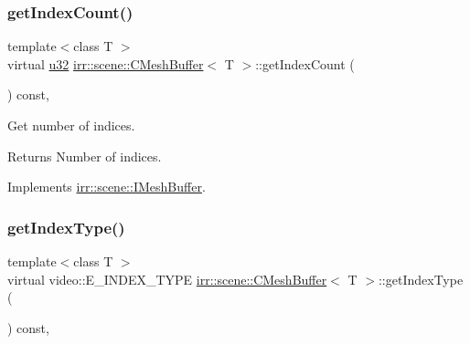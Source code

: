\subsubsection{\texorpdfstring{get\+Index\+Count()}{getIndexCount()}\hspace{0.1cm}{\footnotesize\ttfamily [2/2]}}
{\footnotesize\ttfamily template$<$class T $>$ \\
virtual \hyperlink{namespaceirr_a0416a53257075833e7002efd0a18e804}{u32} \hyperlink{classirr_1_1scene_1_1CMeshBuffer}{irr\+::scene\+::\+C\+Mesh\+Buffer}$<$ T $>$\+::get\+Index\+Count (\begin{DoxyParamCaption}{ }\end{DoxyParamCaption}) const\hspace{0.3cm}{\ttfamily [inline]}, {\ttfamily [virtual]}}



Get number of indices. 

\begin{DoxyReturn}{Returns}
Number of indices. 
\end{DoxyReturn}


Implements \hyperlink{classirr_1_1scene_1_1IMeshBuffer_a96e08662e15b1205516b87ada3301551}{irr\+::scene\+::\+I\+Mesh\+Buffer}.

\mbox{\label{classirr_1_1scene_1_1CMeshBuffer_aa183491690fa47b4697bbfcc7902301c}} 
\subsubsection{\texorpdfstring{get\+Index\+Type()}{getIndexType()}\hspace{0.1cm}{\footnotesize\ttfamily [1/2]}}
{\footnotesize\ttfamily template$<$class T $>$ \\
virtual video\+::\+E\+\_\+\+I\+N\+D\+E\+X\+\_\+\+T\+Y\+PE \hyperlink{classirr_1_1scene_1_1CMeshBuffer}{irr\+::scene\+::\+C\+Mesh\+Buffer}$<$ T $>$\+::get\+Index\+Type (\begin{DoxyParamCaption}{ }\end{DoxyParamCaption}) const\hspace{0.3cm}{\ttfamily [inline]}, {\ttfamily [virtual]}}



